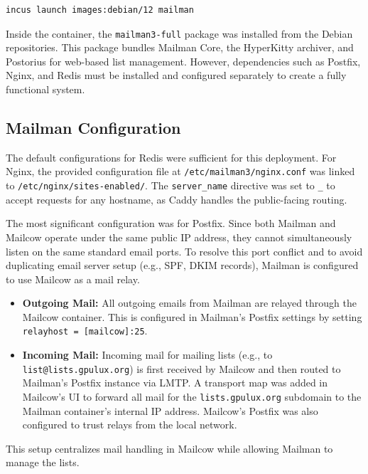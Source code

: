 \begin{lstlisting}[language=bash,caption={Creating the Mailman container.}]
incus launch images:debian/12 mailman
\end{lstlisting}

Inside the container, the \texttt{mailman3-full} package was installed from the Debian repositories. This package bundles Mailman Core, the HyperKitty archiver, and Postorius for web-based list management. However, dependencies such as Postfix, Nginx, and Redis must be installed and configured separately to create a fully functional system.

\subsection*{Mailman Configuration}

The default configurations for Redis were sufficient for this deployment. For Nginx, the provided configuration file at \texttt{/etc/mailman3/nginx.conf} was linked to \texttt{/etc/nginx/sites-enabled/}. The \texttt{server\_name} directive was set to \texttt{\_} to accept requests for any hostname, as Caddy handles the public-facing routing.

The most significant configuration was for Postfix. Since both Mailman and Mailcow operate under the same public IP address, they cannot simultaneously listen on the same standard email ports. To resolve this port conflict and to avoid duplicating email server setup (e.g., SPF, DKIM records), Mailman is configured to use Mailcow as a mail relay.

\begin{itemize}
    \item \textbf{Outgoing Mail:} All outgoing emails from Mailman are relayed through the Mailcow container. This is configured in Mailman's Postfix settings by setting \texttt{relayhost = [mailcow]:25}.
    \item \textbf{Incoming Mail:} Incoming mail for mailing lists (e.g., to \texttt{list@lists.gpulux.org}) is first received by Mailcow and then routed to Mailman's Postfix instance via LMTP. A transport map was added in Mailcow's UI to forward all mail for the \texttt{lists.gpulux.org} subdomain to the Mailman container's internal IP address. Mailcow's Postfix was also configured to trust relays from the local network.
\end{itemize}

This setup centralizes mail handling in Mailcow while allowing Mailman to manage the lists.

